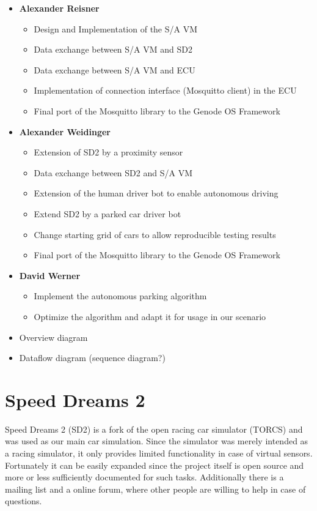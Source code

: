 \documentclass[paper=a4, fontsize=11pt]{scrreprt}
\begin{document}
\begin{itemize}
  \item \textbf{Alexander Reisner}
  \begin{itemize}
    \item Design and Implementation of the S/A VM
    \item Data exchange between S/A VM and SD2
    \item Data exchange between S/A VM and ECU
    \item Implementation of connection interface (Mosquitto client) in the ECU
    \item Final port of the Mosquitto library to the Genode OS Framework
  \end{itemize}
  \item \textbf{Alexander Weidinger}
  \begin{itemize}
    \item Extension of SD2 by a proximity sensor
    \item Data exchange between SD2 and S/A VM
    \item Extension of the human driver bot to enable autonomous driving
    \item Extend SD2 by a parked car driver bot
    \item Change starting grid of cars to allow reproducible testing results
    \item Final port of the Mosquitto library to the Genode OS Framework
  \end{itemize}
  \item \textbf{David Werner}
  \begin{itemize}
    \item Implement the autonomous parking algorithm
    \item Optimize the algorithm and adapt it for usage in our scenario
  \end{itemize}
\end{itemize}

\begin{itemize}
  \item Overview diagram
  \item Dataflow diagram (sequence diagram?)
\end{itemize}

\chapter{Speed Dreams 2}
Speed Dreams 2 (SD2) is a fork of the open racing car simulator (TORCS)
and was used as our main car simulation.
Since the simulator was merely intended as a racing simulator,
it only provides limited functionality in case of virtual sensors.
Fortunately it can be easily expanded since the project itself is open source
and more or less sufficiently documented for such tasks.
Additionally there is a mailing list and a online forum,
where other people are willing to help in case of questions.
\end{document}
